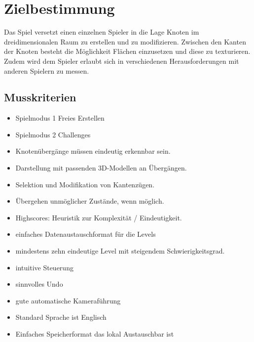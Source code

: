 \chapter{Zielbestimmung}

Das Spiel versetzt einen einzelnen Spieler in die Lage Knoten im dreidimensionalen Raum zu erstellen und zu modifizieren. Zwischen den Kanten der Knoten besteht die Möglichkeit Flächen einzusetzen und diese zu texturieren. Zudem wird dem Spieler erlaubt sich in verschiedenen Herausforderungen mit anderen Spielern zu messen.\\


\section{Musskriterien}

\begin{itemize}

	\item Spielmodus 1 Freies Erstellen
	
	\item Spielmodus 2 Challenges
	
	\item Knotenübergänge müssen eindeutig erkennbar sein.
	
	\item Darstellung mit passenden 3D-Modellen an Übergängen.
	
	\item Selektion und Modifikation von Kantenzügen.
	
	\item Übergehen unmöglicher Zustände, wenn möglich.
	
	\item Highscores: Heuristik zur Komplexität / Eindeutigkeit.
	
	\item einfaches Datenaustauschformat für die Levels
	
	\item mindestens zehn eindeutige Level mit steigendem Schwierigkeitsgrad.
	
	\item intuitive Steuerung
	
	\item sinnvolles Undo
	
	\item gute automatische Kameraführung
	\item Standard Sprache ist Englisch
	

	\item  Einfaches Speicherformat das lokal Austauschbar ist
	
\end{itemize}

